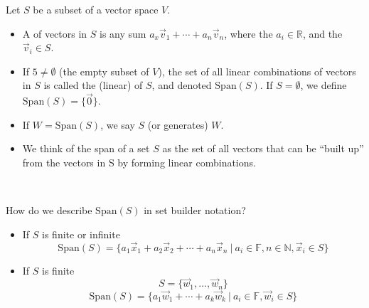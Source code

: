 \documentclass[11pt,fleqn]{book} %
\begin{document}
\setcounter{section}{3}
\setcounter{definitionT}{0}
\begin{definition}
    Let $S$ be a subset of a vector space $V$.
    
    \begin{itemize}
        \item A  of vectors in $S$ is any sum $a_x\vec{v}_1 + \cdots + a_n\vec{v}_n$, where the $a_i \in \mathbb{R}$, and the $\vec{v}_i \in S$.

        \item If $5 \neq \emptyset$ (the empty subset of $V$), the set of all linear combinations of vectors in $S$ is called the (linear)  of $S$, and denoted $\mathrm{Span}(S)$. If $S = \emptyset$, we define $\mathrm{Span}(S) = \{ \vec{0} \}$.

        \item If $W = \mathrm{Span}(S)$, we say $S$  (or generates) $W$.

        \item We think of the span of a set $S$ as the set of all vectors that can be ``built up'' from the vectors in S by forming linear combinations.
    \end{itemize}
\end{definition}
\setcounter{section}{4}

{~~~}

How do we describe $\mathrm{Span}(S)$ in set builder notation? 
\begin{itemize}
  \item If $S$ is finite or infinite 
  $$\mathrm{Span}(S) = \{ a_1\vec{x}_1 + a_2\vec{x}_2 + \cdots + a_n\vec{x}_n ~|~ a_i \in \mathbb{F}, n \in \mathbb{N}, \vec{x}_i \in S \}$$

  \item If $S$ is finite 
  $$S = \{ \vec{w}_1 , \dots, \vec{w}_n \}$$ 
  $$\mathrm{Span}\left( S \right) = \{ a_1\vec{w}_1 + \cdots + a_k\vec{w}_k ~|~ a_i \in \mathbb{F}, \vec{w}_i \in S \}$$
\end{itemize}
\end{document}
